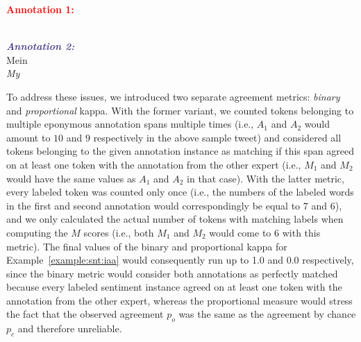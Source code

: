 {
\renewcommand{\thesection}{\arabic{section}}
\begin{example}\label{example:snt:iaa}
\textcolor{red}{\textbf{Annotation 1:}}\\
\upshape{}\\

\noindent\textcolor{darkslateblue}{\textbf{\itshape Annotation 2:}}\\
Mein \\
\itshape My \upshape{}
\end{example}
}

To address these issues, we introduced two separate agreement metrics:
\emph{binary} and \emph{proportional} kappa.  With the former variant,
we counted tokens belonging to multiple eponymous annotation spans
multiple times (i.e., $A_1$ and $A_2$ would amount to $10$ and $9$
respectively in the above sample tweet) and considered all tokens
belonging to the given annotation instance as matching if this span
agreed on at least one token with the annotation from the other expert
(i.e., $M_1$ and $M_2$ would have the same values as $A_1$ and $A_2$
in that case).  With the latter metric, every labeled token was
counted only once (i.e., the numbers of the labeled words in the first
and second annotation would correspondingly be equal to $7$ and $6$),
and we only calculated the actual number of tokens with matching
labels when computing the $M$ scores (i.e., both $M_1$ and $M_2$ would
come to $6$ with this metric).  The final values of the binary and
proportional kappa for Example~\ref{example:snt:iaa} would
consequently run up to 1.0 and 0.0 respectively, since the binary
metric would consider both annotations as perfectly matched because
every labeled sentiment instance agreed on at least one token with the
annotation from the other expert, whereas the proportional measure
would stress the fact that the observed agreement $p_o$ was the same
as the agreement by chance $p_c$ and therefore unreliable.

